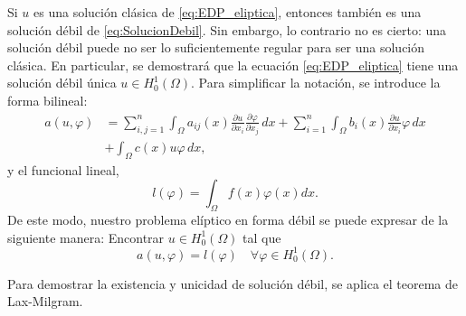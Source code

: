 \documentclass[a4paper,11pt,spanish, twoside, leqno]{tfg-uam}
\theoremstyle{definition}
\begin{document}
Si $u $ es una solución clásica de \eqref{eq:EDP_eliptica}, entonces también es una solución débil de \eqref{eq:SolucionDebil}. Sin embargo, lo contrario no es cierto: una solución débil puede no ser lo suficientemente regular para ser una solución clásica. En particular, se demostrará que la ecuación \eqref{eq:EDP_eliptica} tiene una solución débil única $u \in H^1_0(\Omega) $. Para simplificar la notación, se introduce la forma bilineal:
\begin{equation}
    \begin{aligned}
        a(u,\varphi) &= \sum_{i,j=1}^{n} \int_\Omega a_{ij}(x) \frac{\partial u}{\partial x_i} \frac{\partial \varphi}{\partial x_j}\,dx + \sum_{i=1}^{n} \int_\Omega b_i(x)\frac{\partial u}{\partial x_i} \varphi \,dx  \\ &+ \int_\Omega c(x)u \varphi \,dx,
    \end{aligned}
\end{equation}
y el funcional lineal,
\begin{equation}
    l(\varphi) = \int_\Omega f(x)\varphi(x) dx.
\end{equation}
De este modo, nuestro problema elíptico en forma débil se puede expresar de la siguiente manera: Encontrar $u\in H^1_0(\Omega)$ tal que
\begin{equation}\label{eq:ProblemaDebilFormaBilineal}
    a(u,\varphi) = l(\varphi) \quad \forall \varphi\in H^1_0(\Omega).
\end{equation}

Para demostrar la existencia y unicidad de solución débil, se aplica el teorema de Lax-Milgram. 
\end{document}

